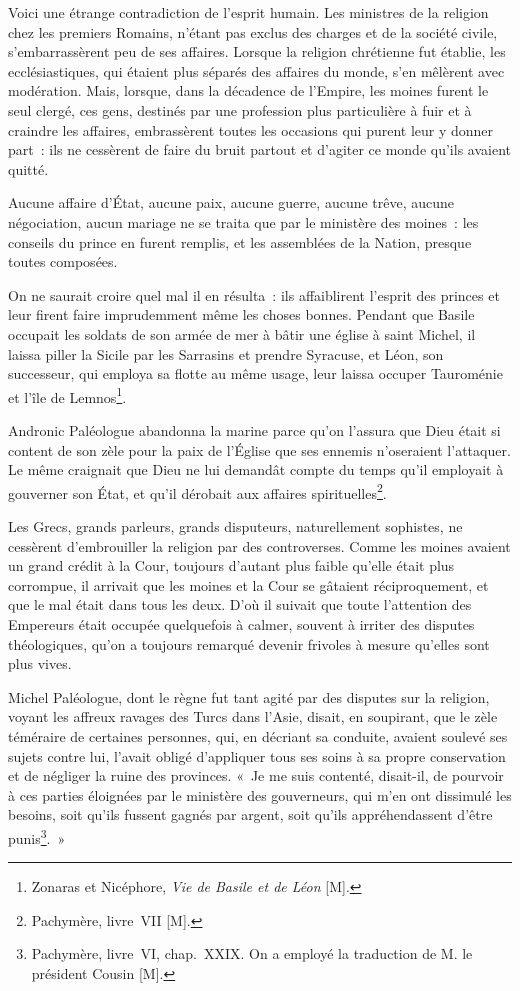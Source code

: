 \documentclass[french,twoside]{book} %
\begin{document}
Voici une étrange contradiction de l’esprit humain. Les ministres de la religion chez les premiers Romains, n’étant pas exclus des charges et de la société civile, s’embarrassèrent peu de ses affaires. Lorsque la religion chrétienne fut établie, les ecclésiastiques, qui étaient plus séparés des affaires du monde, s’en mêlèrent avec modération. Mais, lorsque, dans la décadence de l’Empire, les moines furent le seul clergé, ces gens, destinés par une profession plus particulière à fuir et à craindre les affaires, embrassèrent toutes les occasions qui purent leur y donner part : ils ne cessèrent de faire du bruit partout et d’agiter ce monde qu’ils avaient quitté.\par
Aucune affaire d’État, aucune paix, aucune guerre, aucune trêve, aucune négociation, aucun mariage ne se traita que par le ministère des moines : les conseils du prince en furent remplis, et les assemblées de la Nation, presque toutes composées.\par
On ne saurait croire quel mal il en résulta : ils affaiblirent l’esprit des princes et leur firent faire imprudemment même les choses bonnes. Pendant que Basile occupait les soldats de son armée de mer à bâtir une église à saint Michel, il laissa piller la Sicile par les Sarrasins et prendre Syracuse, et Léon, son successeur, qui employa sa flotte au même usage, leur laissa occuper Tauroménie et l’île de Lemnos\footnote{Zonaras et Nicéphore, {\itshape Vie de Basile et de Léon} [M].}.\par
Andronic Paléologue abandonna la marine parce qu’on l’assura que Dieu était si content de son zèle pour la paix de l’Église que ses ennemis n’oseraient l’attaquer. Le même craignait que Dieu ne lui demandât compte du temps qu’il employait à gouverner son État, et qu’il dérobait aux affaires spirituelles\footnote{Pachymère, livre VII [M].}.\par
Les Grecs, grands parleurs, grands disputeurs, naturellement sophistes, ne cessèrent d’embrouiller la religion par des controverses. Comme les moines avaient un grand crédit à la Cour, toujours d’autant plus faible qu’elle était plus corrompue, il arrivait que les moines et la Cour se gâtaient réciproquement, et que le mal était dans tous les deux. D’où il suivait que toute l’attention des Empereurs était occupée quelquefois à calmer, souvent à irriter des disputes théologiques, qu’on a toujours remarqué devenir frivoles à mesure qu’elles sont plus vives.\par
Michel Paléologue, dont le règne fut tant agité par des disputes sur la religion, voyant les affreux ravages des Turcs dans l’Asie, disait, en soupirant, que le zèle téméraire de certaines personnes, qui, en décriant sa conduite, avaient soulevé ses sujets contre lui, l’avait obligé d’appliquer tous ses soins à sa propre conservation et de négliger la ruine des provinces. « Je me suis contenté, disait-il, de pourvoir à ces parties éloignées par le ministère des gouverneurs, qui m’en ont dissimulé les besoins, soit qu’ils fussent gagnés par argent, soit qu’ils appréhendassent d’être punis\footnote{Pachymère, livre VI, chap. XXIX. On a employé la traduction de M. le président Cousin [M].}. »\par
\end{document}
